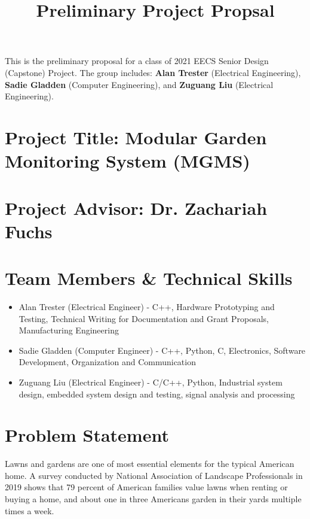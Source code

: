 \documentclass[]{article}
\title{Preliminary Project Propsal}
\begin{document}
\maketitle

This is the preliminary proposal for a class of 2021 EECS Senior Design (Capstone) Project. The group includes: \textbf{Alan Trester} (Electrical Engineering), \textbf{Sadie Gladden} (Computer Engineering), and \textbf{Zuguang Liu} (Electrical Engineering).


\section*{Project Title: Modular Garden Monitoring System (MGMS)}

	
	
\section*{Project Advisor: Dr. Zachariah Fuchs}


\section*{Team Members \& Technical Skills}
\begin{itemize}
	\item Alan Trester (Electrical Engineer) - C++, Hardware Prototyping and Testing, Technical Writing for Documentation and Grant Proposals, Manufacturing Engineering 
	\item Sadie Gladden (Computer Engineer) - C++, Python, C, Electronics, Software Development, Organization and Communication 
	\item Zuguang Liu (Electrical Engineer) - C/C++, Python, Industrial system design, embedded system design and testing, signal analysis and processing
\end{itemize}

\section*{Problem Statement}
	Lawns and gardens are one of most essential elements for the typical American home. A survey conducted by National Association of Landscape Professionals in 2019 shows that 79 percent of American families value lawns when renting or buying a home, and about one in three Americans garden in their yards multiple times a week\cite{noauthor_new_2019}. \\
	
\end{document}
